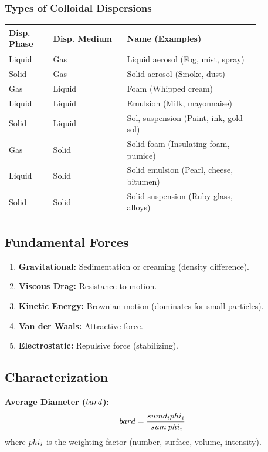 \subsubsection{Types of Colloidal Dispersions}
\begin{center}
\begin{tabular}{p{0.15\linewidth} p{0.25\linewidth} p{0.45\linewidth}}
\toprule
\textbf{Disp. Phase} & \textbf{Disp. Medium} & \textbf{Name (Examples)} \\
\midrule
Liquid & Gas & Liquid aerosol (Fog, mist, spray) \\
Solid & Gas & Solid aerosol (Smoke, dust) \\
Gas & Liquid & Foam (Whipped cream) \\
Liquid & Liquid & Emulsion (Milk, mayonnaise) \\
Solid & Liquid & Sol, suspension (Paint, ink, gold sol) \\
Gas & Solid & Solid foam (Insulating foam, pumice) \\
Liquid & Solid & Solid emulsion (Pearl, cheese, bitumen) \\
Solid & Solid & Solid suspension (Ruby glass, alloys) \\
\bottomrule
\end{tabular}
\end{center}

\subsection{Fundamental Forces}
\begin{enumerate}
    \item \textbf{Gravitational:} Sedimentation or creaming (density difference).
    \item \textbf{Viscous Drag:} Resistance to motion.
    \item \textbf{Kinetic Energy:} Brownian motion (dominates for small particles).
    \item \textbf{Van der Waals:} Attractive force.
    \item \textbf{Electrostatic:} Repulsive force (stabilizing).
\end{enumerate}

\subsection{Characterization}
\textbf{Average Diameter ($\\bar{d}$):}
\begin{equation}
    \\bar{d} = \frac{\\sum d_i \\phi_i}{\\sum \\phi_i}
\end{equation}
where $\\phi_i$ is the weighting factor (number, surface, volume, intensity).
\vspace{0.2cm}